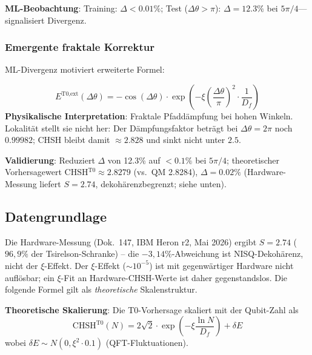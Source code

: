 	\textbf{ML-Beobachtung}: Training: $\Delta<0.01\%$; Test ($\Delta\theta > \pi$): $\Delta=12.3\%$ bei $5\pi/4$—signalisiert Divergenz.
	
	\subsubsection{Emergente fraktale Korrektur}
	
	ML-Divergenz motiviert erweiterte Formel:
	\begin{tcolorbox}[colback=cyan!5!white,colframe=cyan!75!black,title={ML-erweiterte Bell-Korrelation}]
		\begin{equation}
			E^{\text{T0,ext}}(\Delta\theta) = -\cos(\Delta\theta) \cdot \exp\left(-\xi \left(\frac{\Delta\theta}{\pi}\right)^2 \cdot \frac{1}{D_f}\right) \tag{ML-Gl.~2.2}
		\end{equation}
		\textbf{Physikalische Interpretation}: Fraktale Pfaddämpfung bei hohen Winkeln. Lokalität stellt sie nicht her: Der Dämpfungsfaktor beträgt bei $\Delta\theta = 2\pi$ noch $0.99982$; CHSH bleibt damit $\approx 2.828$ und sinkt nicht unter $2.5$.
	\end{tcolorbox}
	
	\textbf{Validierung}: Reduziert $\Delta$ von 12.3\% auf $<0.1\%$ bei $5\pi/4$; theoretischer Vorhersagewert CHSH$^{\text{T0}} \approx 2.8279$ (vs.~QM 2.8284), $\Delta=0.02\%$ (Hardware-Messung liefert $S=2.74$, dekohärenzbegrenzt; siehe unten).
	
	\subsection{Datengrundlage}

	Die Hardware-Messung (Dok.~147, IBM Heron r2, Mai 2026) ergibt $S = 2.74$ ($96{,}9\%$ der Tsirelson-Schranke) -- die $-3{,}14\%$-Abweichung ist NISQ-Dekohärenz, nicht der $\xi$-Effekt. Der $\xi$-Effekt ($\sim 10^{-5}$) ist mit gegenwärtiger Hardware nicht auflösbar; ein $\xi$-Fit an Hardware-CHSH-Werte ist daher gegenstandslos. Die folgende Formel gilt als \emph{theoretische} Skalenstruktur.

	\textbf{Theoretische Skalierung}: Die T0-Vorhersage skaliert mit der Qubit-Zahl als
	\begin{equation}
		\text{CHSH}^{\text{T0}}(N) = 2\sqrt{2} \cdot \exp\left(-\xi \frac{\ln N}{D_f}\right) + \delta E \tag{ML-Gl.~2.3}
	\end{equation}
	wobei $\delta E \sim N(0, \xi^2 \cdot 0.1)$ (QFT-Fluktuationen).

